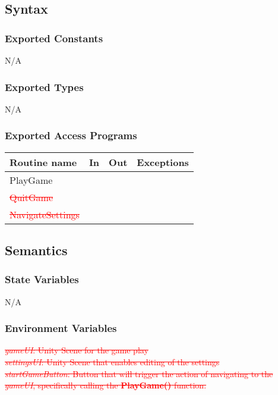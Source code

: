 \documentclass[12pt]{article}
\begin{document}
\subsection {Syntax}

\subsubsection {Exported Constants}
N/A
\subsubsection {Exported Types}
N/A

\subsubsection {Exported Access Programs}

\begin{tabular}{| l | l | l | l |}
\hline
\textbf{Routine name} & \textbf{In} & \textbf{Out} & \textbf{Exceptions}\\
\hline
PlayGame & & & \\
\hline
\textcolor{red}{\sout{QuitGame}} & & & \\
\hline
\textcolor{red}{\sout{NavigateSettings}} & & & \\
\hline
\end{tabular}

\subsection {Semantics}

\subsubsection {State Variables}
N/A

\subsubsection {Environment Variables}
\textcolor{red}{\sout{\textit{gameUI}: Unity Scene for the game play}}\\

\noindent \textcolor{red}{\sout{\textit{settingsUI}: Unity Scene that enables editing of the settings}}\\

\noindent \textcolor{red}{\sout{\textit{startGameButton}: Button that will trigger the action of navigating to the \textit{gameUI}, specifically calling  the \textbf{PlayGame()} function.}}\\
\end{document}
